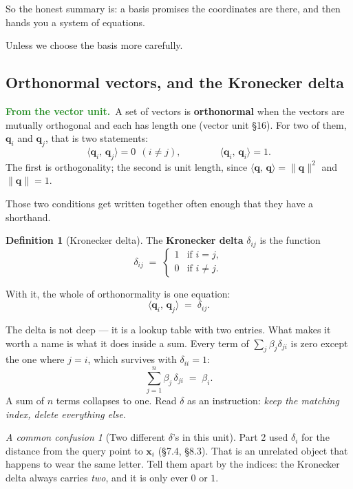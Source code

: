 \documentclass[11pt]{article}
\theoremstyle{plain}
\theoremstyle{definition}
\newtheorem{defn}{Definition}[section]
\theoremstyle{remark}
\newtheorem*{warn}{A common confusion}
\newcommand{\lookback}{\par\smallskip\noindent
  \textbf{\sffamily\textcolor{ForestGreen}{From the vector unit.}}\ \ignorespaces}
\newcommand{\vc}[1]{\mathbf{#1}}
\newcommand{\norm}[1]{\lVert #1\rVert}
\newcommand{\ip}[2]{\langle #1,\, #2\rangle}
\begin{document}
So the honest summary is: a basis promises the coordinates are there, and then
hands you a system of equations.

Unless we choose the basis more carefully.

\subsection{Orthonormal vectors, and the Kronecker delta}
\lookback A set of vectors is \textbf{orthonormal} when the vectors are
mutually orthogonal and each has length one (vector unit \S16). For two of them,
$\vc{q}_{i}$ and $\vc{q}_{j}$, that is two statements:
\[
  \ip{\vc{q}_{i}}{\vc{q}_{j}} = 0 \ \ (i\neq j),
  \qquad\qquad
  \ip{\vc{q}_{i}}{\vc{q}_{i}} = 1 .
\]
The first is orthogonality; the second is unit length, since
$\ip{\vc{q}}{\vc{q}}=\norm{\vc{q}}^{2}$ and $\norm{\vc{q}}=1$.

Those two conditions get written together often enough that they have a
shorthand.

\begin{defn}[Kronecker delta]
The \textbf{Kronecker delta} $\delta_{ij}$ is the function
\[
  \delta_{ij} \;=\;
  \begin{cases}
    1 & \text{if } i = j,\\[2pt]
    0 & \text{if } i \neq j .
  \end{cases}
\]
\end{defn}

\noindent With it, the whole of orthonormality is one equation:
\begin{equation}\label{eq:orthonormal}
  \ip{\vc{q}_{i}}{\vc{q}_{j}} \;=\; \delta_{ij} .
\end{equation}

The delta is not deep --- it is a lookup table with two entries. What makes it
worth a name is what it does inside a sum. Every term of
$\sum_{j}\beta_{j}\delta_{ji}$ is zero except the one where $j=i$, which
survives with $\delta_{ii}=1$:
\begin{equation}\label{eq:sift}
  \sum_{j=1}^{n} \beta_{j}\,\delta_{ji} \;=\; \beta_{i} .
\end{equation}
A sum of $n$ terms collapses to one. Read $\delta$ as an instruction: \emph{keep
the matching index, delete everything else}.

\begin{warn}[Two different $\delta$'s in this unit]
Part 2 used $\delta_{i}$ for the distance from the query point to $\vc{x}_{i}$
(\S7.4, \S8.3). That is an unrelated object that happens to wear the same
letter. Tell them apart by the indices: the Kronecker delta always carries
\emph{two}, and it is only ever $0$ or $1$.
\end{warn}
\end{document}
